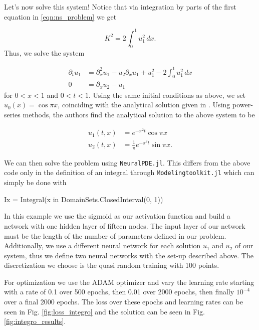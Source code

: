 \documentclass{CUP-JNL-DTM}%
\theoremstyle{definition}
\numberwithin{equation}{section}
\begin{document}
Let's now solve this system! Notice that via integration by parts of the first equation in \ref{eqn:ns_problem} we get

\begin{equation}
    K^2 = 2\int_0^1 u_1^2 \, dx. 
\end{equation}
Thus, we solve the system

\begin{equation}
    \begin{split}
        \partial_t u_1 & = \partial_x^2 u_1 - u_2 \partial_x u_1 + u_1^2 - 2\int_0^1 u_1^2 \,dx \\
        0 & = \partial_x u_2 - u_1
    \end{split}
\end{equation}
for $0 < x < 1$ and $0 < t < 1$. Using the same initial conditions as above, we set $u_0(x) = \cos \pi x$, coinciding with the analytical solution given in \cite{benhammoudaAnalyticalSolutionsSystems2014}. Using power-series methods, the authors find the analytical solution to the above system to be

\begin{equation}
    \begin{split}
        u_1(t,x) & = e^{-\pi^2t}\cos \pi x \\
        u_2(t,x) & = \frac{1}{\pi}e^{-\pi^2t} \sin \pi x. 
    \end{split}
\end{equation}

We can then solve the problem using \texttt{NeuralPDE.jl}. This differs from the above code only in the definition of an integral through \texttt{Modelingtoolkit.jl} which can simply be done with

\begin{jllisting}
Ix = Integral(x in DomainSets.ClosedInterval(0, 1))
\end{jllisting}

In this example we use the sigmoid as our activation function and build a network with one hidden layer of fifteen nodes. The input layer of our network must be the length of the number of parameters defined in our problem. Additionally, we use a different neural network for each solution $u_1$ and $u_2$ of our system, thus we define two neural networks with the set-up described above. The discretization we choose is the quasi random training with 100 points. 

For optimization we use the ADAM optimizer and vary the learning rate starting with a rate of 0.1 over 500 epochs, then 0.01 over 2000 epochs, then finally $10^{-4}$ over a final 2000 epochs. The loss over these epochs and learning rates can be seen in Fig. \ref{fig:loss_integro} and the solution can be seen in Fig. \ref{fig:integro_results}.
\end{document}
